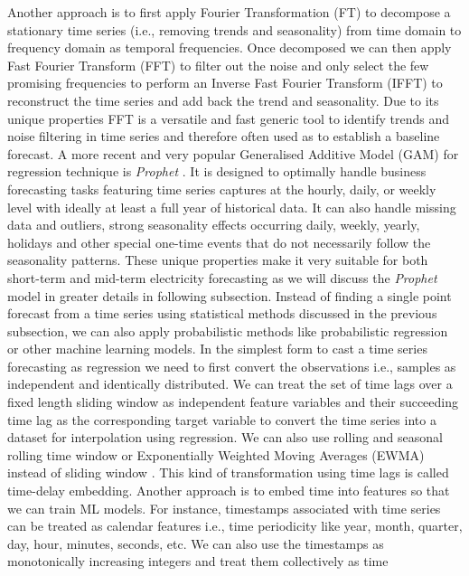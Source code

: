 \documentclass[mstat,12pt]{unswthesis}
\begin{document}
Another approach is to first apply Fourier Transformation (FT) to
decompose a stationary time series (i.e., removing trends and
seasonality) from time domain to frequency domain as temporal
frequencies. Once decomposed we can then apply Fast Fourier Transform
(FFT) \cite{shannon1948mathematical} to filter out the noise and only
select the few promising frequencies to perform an Inverse Fast Fourier
Transform (IFFT) to reconstruct the time series and add back the trend
and seasonality. Due to its unique properties FFT is a versatile and
fast generic tool to identify trends and noise filtering in time series
and therefore often used as to establish a baseline forecast. A more
recent and very popular Generalised Additive Model (GAM) for regression
technique is \emph{Prophet} \cite{taylor2017facebook}. It is designed to
optimally handle business forecasting tasks featuring time series
captures at the hourly, daily, or weekly level with ideally at least a
full year of historical data. It can also handle missing data and
outliers, strong seasonality effects occurring daily, weekly, yearly,
holidays and other special one-time events that do not necessarily
follow the seasonality patterns. These unique properties make it very
suitable for both short-term and mid-term electricity forecasting as we
will discuss the \emph{Prophet} model in greater details in following
subsection. Instead of finding a single point forecast from a time
series using statistical methods discussed in the previous subsection,
we can also apply probabilistic methods like probabilistic regression or
other machine learning models. In the simplest form to cast a time
series forecasting as regression we need to first convert the
observations i.e., samples as independent and identically distributed.
We can treat the set of time lags over a fixed length sliding window as
independent feature variables and their succeeding time lag as the
corresponding target variable to convert the time series into a dataset
for interpolation using regression. We can also use rolling and seasonal
rolling time window or Exponentially Weighted Moving Averages (EWMA)
instead of sliding window \cite{Roberts1959}. This kind of
transformation using time lags is called time-delay embedding. Another
approach is to embed time into features so that we can train ML models.
For instance, timestamps associated with time series can be treated as
calendar features i.e., time periodicity like year, month, quarter, day,
hour, minutes, seconds, etc. We can also use the timestamps as
monotonically increasing integers and treat them collectively as time
\end{document}
